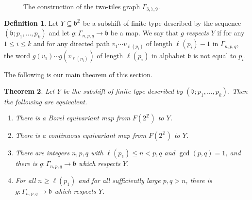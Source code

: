 \documentclass[11pt]{amsart}
\newtheorem{theorem}{Theorem}[section]
\theoremstyle{definition}
\newtheorem{definition}[theorem]{Definition}
\def\Z{\mathbb{Z}}
\def\Z{\mathbb{Z}}
\def\a{m}
\def\bsft{\mathfrak{b}}
\def\e#1{e}
\begin{document}
\begin{figure}[h]
{
}
\caption{\label{fig:onedimgamma}The construction of the two-tiles graph $\Gamma_{3,7,9}$.
}
\end{figure}

\begin{definition} Let $Y\subseteq \bsft^\Z$ be a subshift of finite type described by the sequence
$(\bsft;p_1,\dots,p_k)$ and let $g \colon \Gamma_{n,p,q}
\to \bsft$ be a map. We say that $g$  {\em respects} $Y$ if for any $1\leq i\leq k$ and for any directed path $v_1\cdots v_{\ell(p_i)}$ of length $\ell(p_i)-1$ in $\Gamma_{n,p,q}$, the word $g(v_1)\cdots g(v_{\ell(p_i)})$ of length $\ell(p_i)$ in alphabet $\bsft$ is not equal to $p_i$.
\end{definition}

The following is our main theorem of this section.

\begin{theorem} \label{thm:main}
Let $Y$ be the subshift of finite type described by $(\bsft; p_1,\dots, p_k)$. Then the following are equivalent.
\begin{enumerate}[label=\rm{(\arabic*)}, ref=\arabic*]
\item\label{odd}
There is a Borel equivariant map from $F(2^\Z)$ to $Y$.
\item\label{oda}
There is a continuous equivariant map from $F(2^\Z)$ to $Y$.
\item\label{odb}
There are integers $n,p,q$ with $\ell(p_1)\leq n<p,q$ and $\gcd(p,q)=1$, and there is $g \colon \Gamma_{n,p,q}\to \bsft$ which respects $Y$.
\item\label{odc}
For all $n\geq \ell(p_1)$ and for all sufficiently large $p,q>n$,
 there is $g \colon  \Gamma_{n,p,q}\to \bsft$ which respects $Y$.
\end{enumerate}
\end{theorem}
\end{document}
